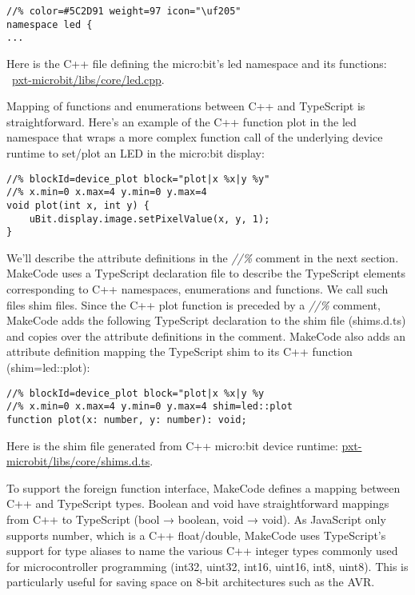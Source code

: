 \begin{lstlisting}
//% color=#5C2D91 weight=97 icon="\uf205"
namespace led { 
...
\end{lstlisting}

Here is the C++ file defining the micro:bit's led namespace and its functions:
~\href{https://github.com/Microsoft/pxt-microbit/blob/master/libs/core/led.cpp}{pxt-microbit/libs/core/led.cpp}.

Mapping of functions and enumerations between C++ and TypeScript is straightforward. 
Here's an example of the C++ function plot in the led namespace that wraps a more
complex function call of the underlying device runtime to set/plot an LED in the micro:bit display:

\begin{lstlisting}
//% blockId=device_plot block="plot|x %x|y %y"
//% x.min=0 x.max=4 y.min=0 y.max=4
void plot(int x, int y) {
    uBit.display.image.setPixelValue(x, y, 1);
}
\end{lstlisting}

We'll describe the attribute definitions in the \emph{//\%} comment in the next section. 
MakeCode uses a  TypeScript declaration file to describe the TypeScript elements corresponding
to C++ namespaces, enumerations and functions.  We call such files shim files.
Since the C++ plot function is preceded by a \emph{//\%} comment, 
MakeCode adds the following TypeScript declaration to the shim file (shims.d.ts) and copies
over the attribute definitions in the comment. MakeCode also adds an attribute definition mapping
the TypeScript shim to its C++ function (shim=led::plot):

\begin{lstlisting}
//% blockId=device_plot block="plot|x %x|y %y
//% x.min=0 x.max=4 y.min=0 y.max=4 shim=led::plot
function plot(x: number, y: number): void;
\end{lstlisting}

Here is the shim file generated from C++ micro:bit device runtime:
\href{https://github.com/Microsoft/pxt-microbit/blob/master/libs/core/shims.d.ts}{pxt-microbit/libs/core/shims.d.ts}.

To support the foreign function interface, MakeCode defines a mapping between C++ and TypeScript types.
Boolean and void have straightforward mappings from C++ to TypeScript (bool → boolean, void → void). 
As JavaScript only supports number, which is a C++ float/double, MakeCode uses TypeScript's support
for type aliases to name the various C++ integer types commonly used for microcontroller programming
(int32, uint32, int16, uint16, int8, uint8). 
This is particularly useful for saving space on 8-bit architectures such as the AVR. 

